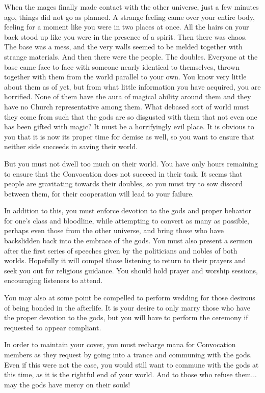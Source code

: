 \documentclass[char]{guildcamp3}
\begin{document}
When the mages finally made contact with the other universe, just a few minutes ago, things did not go as planned. A strange feeling came over your entire body, feeling for a moment like you were in two places at once. All the hairs on your back stood up like you were in the presence of a spirit. Then there was chaos. The base was a mess, and the very walls seemed to be melded together with strange materials. And then there were the people. The doubles. Everyone at the base came face to face with someone nearly identical to themselves, thrown together with them from the world parallel to your own. You know very little about them as of yet, but from what little information you have acquired, you are horrified. None of them have the aura of magical ability around them and they have no Church representative among them. What debased sort of world must they come from such that the gods are so disgusted with them that not even one has been gifted with magic? It must be a horrifyingly evil place. It is obvious to you that it is now its proper time for demise as well, so you want to ensure that neither side succeeds in saving their world.

But you must not dwell too much on their world. You have only hours remaining to ensure that the Convocation does not succeed in their task. It seems that people are gravitating towards their doubles, so you must try to sow discord between them, for their cooperation will lead to your failure.

In addition to this, you must enforce devotion to the gods and proper behavior for one's class and bloodline, while attempting to convert as many as possible, perhaps even those from the other universe, and bring those who have backslidden back into the embrace of the gods. You must also present a sermon after the first series of speeches given by the politicians and nobles of both worlds. Hopefully it will compel those listening to return to their prayers and seek you out for religious guidance. You should hold prayer and worship sessions, encouraging listeners to attend.

You may also at some point be compelled to perform wedding for those desirous of being bonded in the afterlife. It is your desire to only marry those who have the proper devotion to the gods, but you will have to perform the ceremony if requested to appear compliant.

In order to maintain your cover, you must recharge mana for Convocation members as they request by going into a trance and communing with the gods. Even if this were not the case, you would still want to commune with the gods at this time, as it is the rightful end of your world. And to those who refuse them... may the gods have mercy on their souls! 
\end{document}

